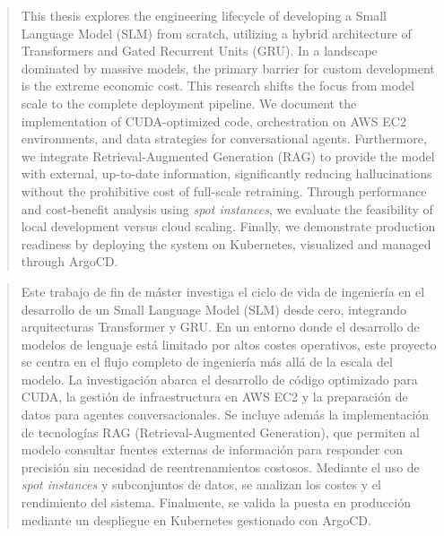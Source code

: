 \cleardoublepage
\vspace*{\fill}
\begin{abstract}
    This thesis explores the engineering lifecycle of developing a Small Language Model (SLM) from scratch, utilizing a hybrid architecture of Transformers and Gated Recurrent Units (GRU). In a landscape dominated by massive models, the primary barrier for custom development is the extreme economic cost. This research shifts the focus from model scale to the complete deployment pipeline. We document the implementation of CUDA-optimized code, orchestration on AWS EC2 environments, and data strategies for conversational agents. Furthermore, we integrate Retrieval-Augmented Generation (RAG) to provide the model with external, up-to-date information, significantly reducing hallucinations without the prohibitive cost of full-scale retraining. Through performance and cost-benefit analysis using \textit{spot instances}, we evaluate the feasibility of local development versus cloud scaling. Finally, we demonstrate production readiness by deploying the system on Kubernetes, visualized and managed through ArgoCD.
\end{abstract}
\vspace*{\fill}
\clearpage

\vspace*{\fill}
\begin{abstract}
    Este trabajo de fin de máster investiga el ciclo de vida de ingeniería en el desarrollo de un Small Language Model (SLM) desde cero, integrando arquitecturas Transformer y GRU. En un entorno donde el desarrollo de modelos de lenguaje está limitado por altos costes operativos, este proyecto se centra en el flujo completo de ingeniería más allá de la escala del modelo. La investigación abarca el desarrollo de código optimizado para CUDA, la gestión de infraestructura en AWS EC2 y la preparación de datos para agentes conversacionales. Se incluye además la implementación de tecnologías RAG (Retrieval-Augmented Generation), que permiten al modelo consultar fuentes externas de información para responder con precisión sin necesidad de reentrenamientos costosos. Mediante el uso de  \textit{spot instances} y subconjuntos de datos, se analizan los costes y el rendimiento del sistema. Finalmente, se valida la puesta en producción mediante un despliegue en Kubernetes gestionado con ArgoCD.
\end{abstract}
\vspace*{\fill}
\clearpage

